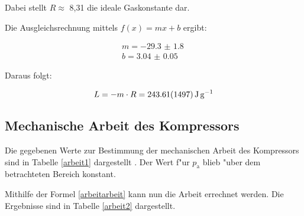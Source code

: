 Dabei stellt $R \approx$ 8,31 die ideale Gaskonstante dar.

Die Ausgleichsrechnung mittels $f(x)=m x + b$ ergibt:

\begin{eqnarray}
	m = \SI{-29.3(18)}{}\\
	b = \SI{3.04(5)}{}
\end{eqnarray}

Daraus folgt:

\begin{equation}
	L = -m \cdot R = \SI{243.61 (1497)}{\joule\per\gram}
\end{equation}



\subsection{Mechanische Arbeit des Kompressors} %
\label{sub:mechanische_arbeit}



Die gegebenen Werte zur Bestimmung der mechanischen Arbeit des Kompressors sind in Tabelle \ref{arbeit1} dargestellt \cite{anleitung}. Der Wert f"ur $p_\mathrm{a}$ blieb "uber dem betrachteten Bereich konstant.

Mithilfe der Formel \ref{arbeitarbeit} kann nun die Arbeit errechnet werden. Die Ergebnisse sind in Tabelle \ref{arbeit2} dargestellt.



\clearpage